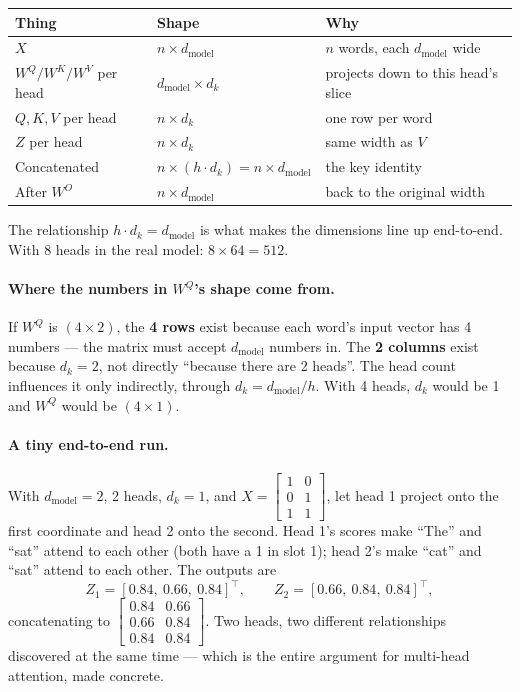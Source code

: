 \documentclass[11pt,a4paper]{article}
\begin{document}
\begin{center}
\begin{tabularx}{\textwidth}{lYY}
\textbf{Thing} & \textbf{Shape} & \textbf{Why} \\
\hline
$X$ & $n \times d_{\text{model}}$ & $n$ words, each $d_{\text{model}}$ wide \\
$W^Q / W^K / W^V$ per head & $d_{\text{model}} \times d_k$ & projects down to this head's slice \\
$Q, K, V$ per head & $n \times d_k$ & one row per word \\
$Z$ per head & $n \times d_k$ & same width as $V$ \\
Concatenated & $n \times (h \cdot d_k) = n \times d_{\text{model}}$ & the key identity \\
After $W^O$ & $n \times d_{\text{model}}$ & back to the original width \\
\end{tabularx}
\end{center}
The relationship $h \cdot d_k = d_{\text{model}}$ is what makes the dimensions line up
end-to-end. With 8 heads in the real model: $8 \times 64 = 512$.

\paragraph{Where the numbers in $W^Q$'s shape come from.} If $W^Q$ is $(4 \times 2)$, the
\textbf{4 rows} exist because each word's input vector has 4 numbers --- the matrix must
accept $d_{\text{model}}$ numbers in. The \textbf{2 columns} exist because $d_k = 2$, not
directly ``because there are 2 heads''. The head count influences it only indirectly, through
$d_k = d_{\text{model}}/h$. With 4 heads, $d_k$ would be 1 and $W^Q$ would be $(4 \times 1)$.

\paragraph{A tiny end-to-end run.} With $d_{\text{model}} = 2$, 2 heads, $d_k = 1$, and
$X = \begin{bmatrix}1&0\\0&1\\1&1\end{bmatrix}$, let head 1 project onto the first coordinate
and head 2 onto the second. Head 1's scores make ``The'' and ``sat'' attend to each other
(both have a 1 in slot 1); head 2's make ``cat'' and ``sat'' attend to each other. The outputs
are
\[
Z_1 = [0.84,\ 0.66,\ 0.84]^\top, \qquad Z_2 = [0.66,\ 0.84,\ 0.84]^\top,
\]
concatenating to $\begin{bmatrix}0.84&0.66\\0.66&0.84\\0.84&0.84\end{bmatrix}$. Two heads,
two different relationships discovered at the same time --- which is the entire argument for
multi-head attention, made concrete.
\end{document}
